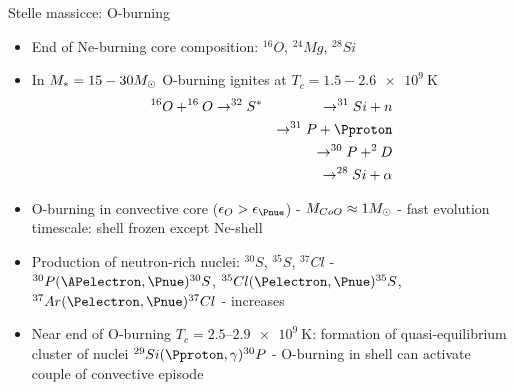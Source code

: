 \begin{frame}{Stelle massicce: O-burning} 
\begin{itemize}
	\item End of Ne-burning core composition: $^{16}O$, $^{24}Mg$, $^{28}Si$
	\item In $M_*=15-30M_{\odot}$ O-burning ignites at $T_c=1.5-2.6\SI{e9}{\kelvin}$
	\begin{alignat*}{2}
	&^{16}O+^{16}O\to^{32}S^*&\to^{31}Si+n\\
	&&\to^{31}P+\Pproton\\
	&&\to^{30}P+^2D\\
	&&\to^{28}Si+\alpha
	\end{alignat*}
	\item O-burning in convective core ($\epsilon_O>\epsilon_{\Pnue}$) - $M_{CoO}\approx1M_{\odot}$ - fast evolution timescale: shell frozen except Ne-shell
	\item Production of neutron-rich nuclei: $^{30}S$, $^{35}S$, $^{37}Cl$ - $^{30}P(\APelectron,\Pnue)^{30}S$, $^{35}Cl(\Pelectron,\Pnue)^{35}S$, $^{37}Ar(\Pelectron,\Pnue)^{37}Cl$ -  increases
	\item Near end of O-burning $T_c=\numrange{2.5}{2.9}\SI{e9}{\kelvin}$: formation of quasi-equilibrium cluster of nuclei $^{29}Si(\Pproton,\gamma)^{30}P$ - O-burning in shell can activate couple of convective episode
\end{itemize}
\end{frame}

